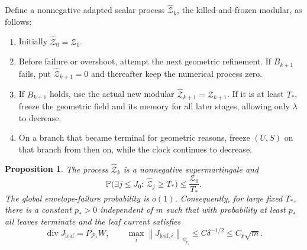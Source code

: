 \documentclass[11pt]{article}
\newtheorem{proposition}[proposition]{Proposition}
\theoremstyle{definition}
\theoremstyle{remark}
\numberwithin{equation}{section}
\newcommand{\Pp}{\mathbb P}
\newcommand{\pr}{\mathcal P}
\newcommand{\divv}{\operatorname{div}}
\newcommand{\norm}[1]{\left\|#1\right\|}
\begin{document}
Define a nonnegative adapted scalar process $\widehat{\mathcal Z}_k$,
the killed-and-frozen modular, as follows:
\begin{enumerate}[label=(\roman*),leftmargin=2.7em]
\item Initially $\widehat{\mathcal Z}_0=\mathcal Z_0$.
\item Before failure or overshoot, attempt the next geometric
  refinement. If $B_{k+1}$ fails, put
  $\widehat{\mathcal Z}_{k+1}=0$ and thereafter keep the
  numerical process zero.
\item If $B_{k+1}$ holds, use the actual new modular
  $\widehat{\mathcal Z}_{k+1}=\mathcal Z_{k+1}$. If it is at
  least $T_*$, freeze the geometric field and its memory for all
  later stages, allowing only $\lambda$ to decrease.
\item On a branch that became terminal for geometric reasons,
  freeze $(U,S)$ on that branch from then on, while the clock
  continues to decrease.
\end{enumerate}

\begin{proposition}
\label{prop:stopped}
The process $\widehat{\mathcal Z}_k$ is a nonnegative supermartingale
and
\begin{equation}\label{eq:overshoot}
 \Pp\bigl(\exists j\le J_0:\,\widehat{\mathcal Z}_j\ge T_*\bigr)
 \le \frac{\mathcal Z_0}{T_*}.
\end{equation}
The global envelope-failure probability is $o(1)$.
Consequently, for large fixed $T_*$, there is a constant
$p_*>0$ independent of $m$ such that with probability at least
$p_*$ all leaves terminate and the leaf current satisfies
\begin{equation}\label{eq:leafbound}
 \divv J_{\mathrm{leaf}}=P_{\pr_*}W,
 \qquad \max_i\norm{J_{\mathrm{leaf},i}}_{\psi_{r_i}}
 \le C\delta^{-1/2}\le C_{\boldsymbol r}\sqrt m.
\end{equation}
\end{proposition}
\end{document}
